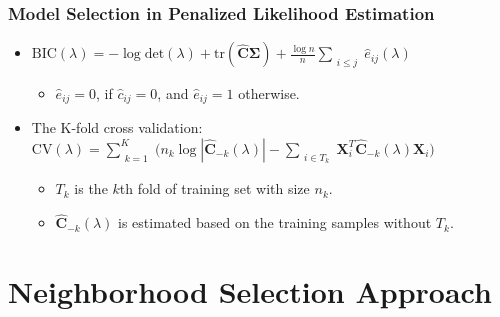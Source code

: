 \documentclass{beamer}
\newcommand{\boldSigma}{{\boldsymbol{\Sigma}}}
\begin{document}
\begin{frame}
\frametitle{Model Selection in Penalized Likelihood Estimation}

\begin{itemize}

\item $\text{BIC}(\lambda) = - \log \text{det}(\lambda) + \text{tr}(\hat{\mathbf{C}} \boldSigma) + \frac{\log{n}}{n} \sum_{\substack{i \leq j}} \hat{e}_{ij}(\lambda) $
    \begin{itemize}
    \item $\hat{e}_{ij} = 0$, if $\hat{c}_{ij} = 0$, and $\hat{e}_{ij} = 1$ otherwise.
    \end{itemize}
    
\item The K-fold cross validation: $\text{CV}(\lambda) = \sum_{\substack{k = 1}}^K \Big( n_k \log |\hat{\mathbf{C}}_{-k}(\lambda)| - \sum_{\substack{i \in T_k}} \mathbf{X}_{i}^{T} \hat{\mathbf{C}}_{-k}(\lambda) \mathbf{X}_i \Big) $  
    \begin{itemize}
    \item $T_k$ is the $k$th fold of training set with size $n_k$. 
    \item $\hat{\mathbf{C}}_{-k}(\lambda)$ is estimated based on the training samples without $T_k$. 
    \end{itemize}
    
\end{itemize}

\end{frame}

\section{Neighborhood Selection Approach}
\end{document}
